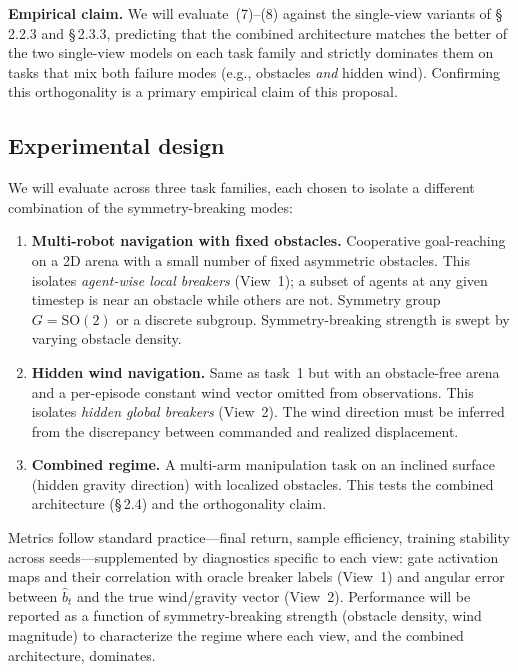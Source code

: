 \documentclass[11pt]{article}
\begin{document}
\textbf{Empirical claim.} We will evaluate~(7)--(8) against the single-view
variants of \S\,2.2.3 and \S\,2.3.3, predicting that the combined architecture
matches the better of the two single-view models on each task family and
strictly dominates them on tasks that mix both failure modes (e.g., obstacles
\textit{and} hidden wind). Confirming this orthogonality is a primary empirical
claim of this proposal.

\subsection*{Experimental design}

We will evaluate across three task families, each chosen to isolate a
different combination of the symmetry-breaking modes:
\begin{enumerate}[noitemsep,topsep=2pt]
  \item \textbf{Multi-robot navigation with fixed obstacles.} Cooperative
    goal-reaching on a 2D arena with a small number of fixed asymmetric
    obstacles. This isolates \textit{agent-wise local breakers} (View~1); a subset
    of agents at any given timestep is near an obstacle while others are not.
    Symmetry group $G = \mathrm{SO}(2)$ or a discrete subgroup.
    Symmetry-breaking strength is swept by varying obstacle density.

  \item \textbf{Hidden wind navigation.} Same as task~1 but with an
    obstacle-free arena and a per-episode constant wind vector omitted from
    observations. This isolates \textit{hidden global breakers} (View~2). The
    wind direction must be inferred from the discrepancy between commanded
    and realized displacement.

  \item \textbf{Combined regime.} A multi-arm manipulation task on an inclined
    surface (hidden gravity direction) with localized obstacles. This tests
    the combined architecture (\S\,2.4) and the orthogonality claim.
\end{enumerate}

Metrics follow standard practice---final return, sample efficiency, training
stability across seeds---supplemented by diagnostics specific to each view:
gate activation maps and their correlation with oracle breaker labels (View~1)
and angular error between $\widehat{b}_t$ and the true wind/gravity vector
(View~2). Performance will be reported as a function of symmetry-breaking
strength (obstacle density, wind magnitude) to characterize the regime where
each view, and the combined architecture, dominates.
\end{document}
